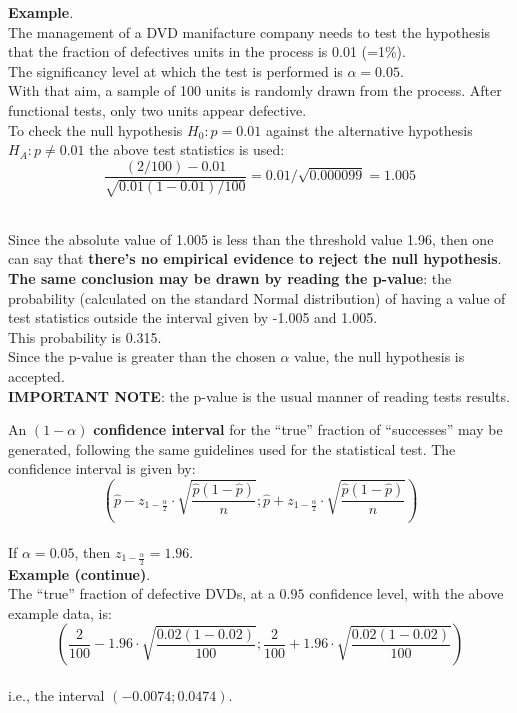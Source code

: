 \begin{frame}
  \textbf{Example}.\\
  \vspace{0.25cm}
  The management of a DVD manifacture company needs to test the hypothesis that the fraction of defectives units in the process is 0.01 (=1\%). \\
  The significancy level at which the test is performed is $ \alpha = 0.05 $.\\
  \vspace{0.25cm}
  With that aim, a sample of 100 units is randomly drawn from the process. After functional tests, only two units appear defective.\\
  \vspace{0.25cm}
  To check the null hypothesis $ H_0: p = 0.01 $ against the alternative hypothesis $ H_A: p \neq 0.01 $ the above test statistics is used:
  $$ \frac{(2/100) - 0.01}{\sqrt{0.01 (1-0.01) / 100}} = 0.01 / \sqrt{0.000099} = 1.005 $$\
\end{frame}

\begin{frame}
  \vspace{0.25cm}
  Since the absolute value of 1.005 is less than the threshold value 1.96, then one can say that \textbf{there's no empirical evidence to reject the null hypothesis}.\\ 
  \vspace{0.5cm}
  \textbf{The same conclusion may be drawn by reading the p-value}: the probability (calculated on the standard Normal distribution) of having a value of test statistics outside the interval given by -1.005 and 1.005.\\
  This probability is 0.315.\\
  Since the p-value is greater than the chosen $ \alpha $ value, the null hypothesis is accepted.\\
  \vspace{0.25cm}
  \textbf{IMPORTANT NOTE}: the p-value is the usual manner of reading tests results.
\end{frame}

\begin{frame}
  An $(1-\alpha)$ \textbf{confidence interval} for the ``true'' fraction of ``successes'' may be generated, following the same guidelines used for the statistical test. The confidence interval is given by:
  $$ \left( \hat{p} - z_{1-\frac{\alpha}{2}} \cdot \sqrt{\frac{\hat{p} (1-\hat{p})}{n}}; \hat{p} + z_{1-\frac{\alpha}{2}} \cdot \sqrt{\frac{\hat{p} (1-\hat{p})}{n}} \right) $$\\
  If $\alpha=0.05$, then $z_{1-\frac{\alpha}{2}}=1.96$.\\
  \textbf{Example (continue)}.\\
  The ``true'' fraction of defective DVDs, at a $ 0.95 $ confidence level, with the above example data, is:
  $$ \left( \frac{2}{100} - 1.96 \cdot \sqrt{\frac{0.02 (1-0.02)}{100}}; \frac{2}{100} + 1.96 \cdot \sqrt{\frac{0.02 (1-0.02)}{100}} \right) $$\\
  \vspace{-0.15cm}
  i.e., the interval $ \left(-0.0074; 0.0474\right) $.
\end{frame}

